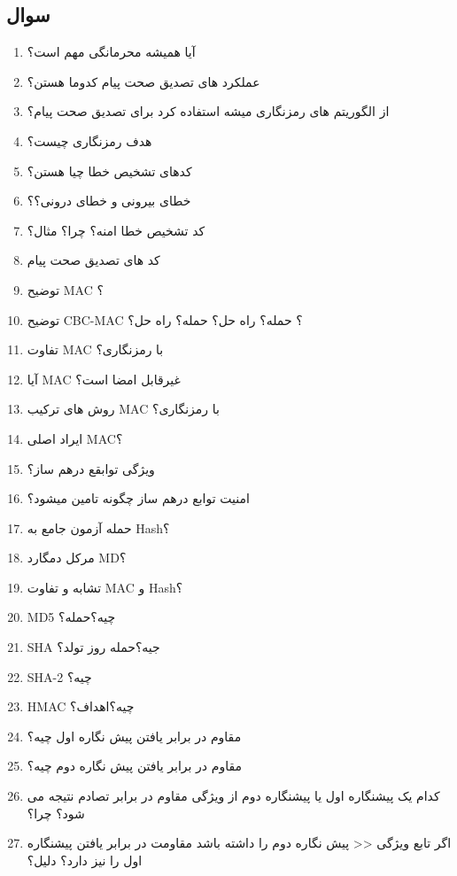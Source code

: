 \documentclass{report}
\begin{document}
	\subsection{سوال}
	\begin{enumerate}
		\item 
		  آیا همیشه محرمانگی مهم است؟
		\item 
		  عملکرد های تصدیق صحت پیام کدوما هستن؟
		  \item 
		       از الگوریتم های رمزنگاری میشه استفاده کرد برای تصدیق صحت پیام؟
		  
		  \item 
		 هدف رمزنگاری چیست؟
		  \item 
		  کدهای تشخیص خطا چیا هستن؟
		  \item 
		خطای بیرونی و خطای درونی؟؟
		  \item 
  کد تشخیص خطا امنه؟ چرا؟ مثال؟
		  \item 
کد های تصدیق صحت پیام
		  \item 
توضیح MAC ؟
		  \item 
توضیح CBC-MAC ؟ حمله؟ راه حل؟ حمله؟ راه حل؟
		  \item 
تفاوت MAC با رمزنگاری؟
		  \item 
		  آیا MAC غیرقابل امضا است؟
		  \item 
روش های ترکیب MAC با رمزنگاری؟
		  \item 
ایراد اصلی MAC؟
		  \item 
ویژگی توابقع درهم ساز؟
		  \item 
امنیت توابع درهم ساز چگونه تامین میشود؟
		  \item 
حمله آزمون جامع به Hash؟
		  \item 
مرکل دمگارد MD؟ 
		  \item 
تشابه و تفاوت MAC و Hash؟
		  \item 
		  		MD5
		  چیه؟حمله؟
		  \item 
				SHA
				جیه؟حمله روز تولد؟
		  \item 
				SHA-2 
				چیه؟
		  \item 
				HMAC
				چیه؟اهداف؟
		  \item 
				مقاوم در برابر یافتن پیش نگاره اول چیه؟
		  \item 
				مقاوم در برابر یافتن پیش نگاره دوم چیه؟
		  \item 
 				کدام یک پیشنگاره اول یا پیشنگاره دوم از ویژگی مقاوم در برابر تصادم نتیجه می شود؟ چرا؟
		  \item 
				اگر تابع ویژگی << پیش نگاره دوم را داشته باشد مقاومت در برابر یافتن پیشنگاره اول را نیز دارد؟ دلیل؟
		  
	\end{enumerate}
\end{document}
